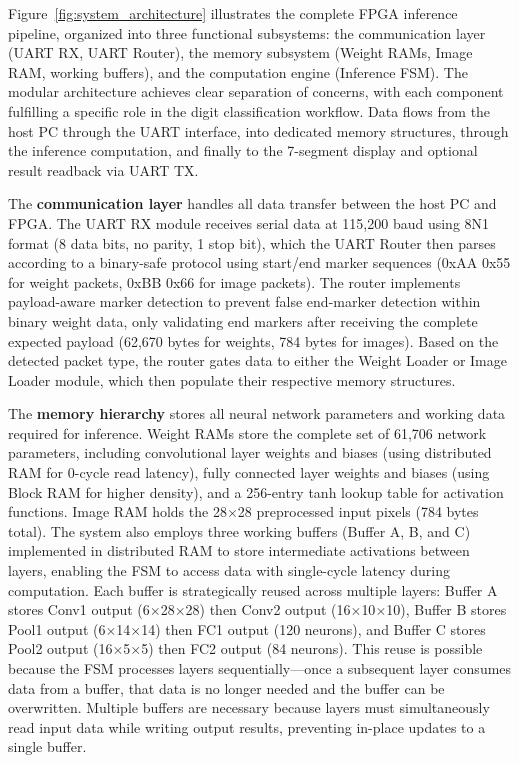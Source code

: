 \documentclass[12pt,a4paper]{report}
\begin{document}
Figure~\ref{fig:system_architecture} illustrates the complete FPGA inference pipeline, organized into three functional subsystems: the communication layer (UART RX, UART Router), the memory subsystem (Weight RAMs, Image RAM, working buffers), and the computation engine (Inference FSM). The modular architecture achieves clear separation of concerns, with each component fulfilling a specific role in the digit classification workflow. Data flows from the host PC through the UART interface, into dedicated memory structures, through the inference computation, and finally to the 7-segment display and optional result readback via UART TX.

The \textbf{communication layer} handles all data transfer between the host PC and FPGA. The UART RX module receives serial data at 115,200 baud using 8N1 format (8 data bits, no parity, 1 stop bit), which the UART Router then parses according to a binary-safe protocol using start/end marker sequences (0xAA 0x55 for weight packets, 0xBB 0x66 for image packets). The router implements payload-aware marker detection to prevent false end-marker detection within binary weight data, only validating end markers after receiving the complete expected payload (62,670 bytes for weights, 784 bytes for images). Based on the detected packet type, the router gates data to either the Weight Loader or Image Loader module, which then populate their respective memory structures.

The \textbf{memory hierarchy} stores all neural network parameters and working data required for inference. Weight RAMs store the complete set of 61,706 network parameters, including convolutional layer weights and biases (using distributed RAM for 0-cycle read latency), fully connected layer weights and biases (using Block RAM for higher density), and a 256-entry tanh lookup table for activation functions. Image RAM holds the 28$\times$28 preprocessed input pixels (784 bytes total). The system also employs three working buffers (Buffer A, B, and C) implemented in distributed RAM to store intermediate activations between layers, enabling the FSM to access data with single-cycle latency during computation. Each buffer is strategically reused across multiple layers: Buffer A stores Conv1 output (6$\times$28$\times$28) then Conv2 output (16$\times$10$\times$10), Buffer B stores Pool1 output (6$\times$14$\times$14) then FC1 output (120 neurons), and Buffer C stores Pool2 output (16$\times$5$\times$5) then FC2 output (84 neurons). This reuse is possible because the FSM processes layers sequentially—once a subsequent layer consumes data from a buffer, that data is no longer needed and the buffer can be overwritten. Multiple buffers are necessary because layers must simultaneously read input data while writing output results, preventing in-place updates to a single buffer.
\end{document}
